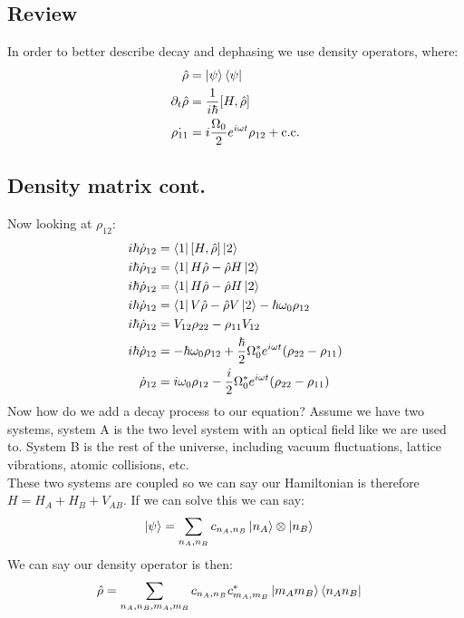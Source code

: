 \subsection{Review}
In order to better describe decay and dephasing we use density operators, where:
\begin{align*}
	\hat{\rho} &= \ket{\psi}\bra{\psi} \\
	\partial_t \hat{\rho} &= \frac{1}{i\hbar} [H,\hat{\rho}] \\
	\dot{\rho_{11}} &= i\frac{\Omega_0}{2} e^{i\omega t} \rho_{12} + \text{c.c.}
\end{align*}
\subsection{Density matrix cont.}
Now looking at $\rho_{12}$:
\begin{align*}
	i\hbar \dot{\rho}_{12} &= \bra{1}[H,\hat{\rho}]\ket{2} \\
	i\hbar \dot{\rho}_{12} &= \bra{1}H\hat{\rho} - \hat{\rho} H\ket{2} \\
	i\hbar \dot{\rho}_{12} &= \bra{1}H\hat{\rho} - \hat{\rho} H\ket{2} \\
	i\hbar \dot{\rho}_{12} &= \bra{1}V\hat{\rho} - \hat{\rho} V\ket{2} -\hbar\omega_0\rho_{12}\\
	i\hbar \dot{\rho}_{12} &= V_{12}\rho_{22} - \rho_{11} V_{12} \\
	i\hbar \dot{\rho}_{12} &= -\hbar\omega_0 \rho_{12} + \frac{\hbar}{2}\Omega_0^* e^{i\omega t} (\rho_{22} - \rho_{11}) \\
	\dot{\rho}_{12} &= i\omega_0 \rho_{12} - \frac{i}{2}\Omega_0^* e^{i\omega t} (\rho_{22} - \rho_{11})
\end{align*}
Now how do we add a decay process to our equation? Assume we have two systems, system A is the two level system with an optical field like we are used to. System B is the rest of the universe, including vacuum fluctuations, lattice vibrations, atomic collisions, etc.\\
These two systems are coupled so we can say our Hamiltonian is therefore $H = H_A + H_B + V_{AB}$. If we can solve this we can say:
\begin{align*}
	\ket{\psi} &= \sum_{n_A,n_B} c_{n_A,n_B} \ket{n_A}\otimes\ket{n_B}
\end{align*}
We can say our density operator is then:
\begin{align*}
	\hat{\rho} &= \sum_{n_A,n_B,m_A,m_B} c_{n_A,n_B}c_{m_A,m_B}^* \ket{m_Am_B}\bra{n_An_B}
\end{align*}
